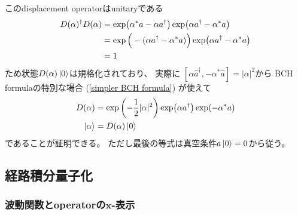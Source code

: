 このdisplacement operatorはunitaryである
\begin{align}
    D(\alpha)^\dagger D(\alpha) &=
    \exp(
        \alpha^* \hat{a}
        - \alpha \hat{a}^\dagger
    )
    \exp(
        \alpha\hat{a}^\dagger
        - \alpha^* \hat{a}
    )
\notag\\&=
    \exp\Big(
        - (
        \alpha \hat{a}^\dagger
        -
        \alpha^* \hat{a}
        )
    \Big)
    \exp(
        \alpha\hat{a}^\dagger
        - \alpha^* \hat{a}
    )
\notag\\&=
    1
\end{align}
ため状態$D(\alpha)\ket{0}$は規格化されており、
実際に
$[
    \alpha \hat{a}^\dagger,
     - \alpha^* \hat{a}
]
= |\alpha|^2$から
BCH formulaの特別な場合
(\ref{simpler BCH formula})
が使えて
\begin{align}
    D(\alpha) &= \exp\left(
        - \dfrac{1}{2}|\alpha|^2
    \right)
    \exp(\alpha \hat{a}^\dagger)
    \exp( - \alpha^* \hat{a})
\notag\\
    \ket{\alpha} &= D(\alpha) \ket{0}
\end{align}
であることが証明できる。
ただし最後の等式は真空条件$\hat{a}\ket{0}=0$から従う。

\subsection{経路積分量子化}

\subsubsection{波動関数とoperatorの$\bm{x}$-表示}

